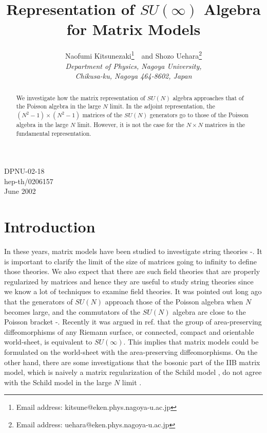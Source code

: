 \documentclass[a4paper,12pt]{article}
\begin{document}
\title{Representation of $SU(\infty)$ Algebra for Matrix Models}
\author{{\sc Naofumi Kitsunezaki}\thanks{Email address:
kitsune@eken.phys.nagoya-u.ac.jp}~~and
{\sc Shozo Uehara}\thanks{Email address:
uehara@eken.phys.nagoya-u.ac.jp}\\
{\it Department of Physics, Nagoya University,}\\
{\it Chikusa-ku, Nagoya 464-8602, Japan}}
\date{}
\maketitle
\vspace{-80mm}
\begin{flushright}
	DPNU-02-18\\
	hep-th/0206157\\
	June 2002
\end{flushright}
\vspace{50mm}
\begin{abstract}
We investigate how the matrix representation of $SU(N)$ algebra
approaches that of the Poisson algebra in the large $N$ limit.
In the adjoint representation, the $(N^2-1)\times(N^2-1)$ matrices
of the $SU(N)$ generators go to those of the Poisson algebra in the
large $N$ limit.
However, it is not the case for the $N\times N$ matrices in the
fundamental representation.
\end{abstract}
\section{Introduction}
In these years, matrix models have been studied to investigate string
theories \cite{BFSS}-\cite{AIKO}.
It is important to clarify the limit of the size of matrices
going to infinity to define those theories. We also expect that
there are such field theories that are properly regularized by
matrices and hence they are useful to study string theories since we
know a lot of techniques to examine field theories.
It was pointed out long ago that the generators of $SU(N)$
approach those of the Poisson algebra when $N$ becomes large, and the
commutators of the $SU(N)$ algebra are close to the Poisson bracket
\cite{Hoppe}-\cite{hoppesch}.
Recently it was argued in ref.\cite{zunger} that the group of
area-preserving diffeomorphisms of any Riemann surface, or connected,
compact and orientable world-sheet, is equivalent to $SU(\infty)$.
This implies that matrix models could be formulated on the world-sheet
with the area-preserving diffeomorphisms.
On the other hand, there are some investigations that the bosonic part
of the IIB matrix model, which is naively a matrix regularization of
the Schild model \cite{Schild:vq}, do not agree with the Schild model
in the large $N$ limit \cite{KU,ANO}.
\end{document}
